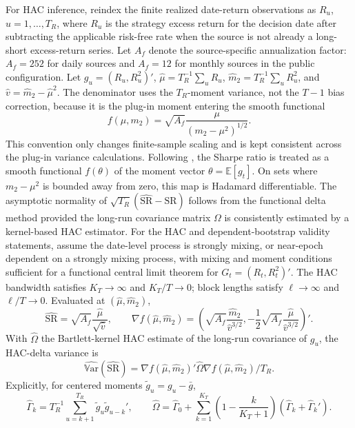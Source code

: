 \documentclass[12pt,a4paper]{article}
\newcommand{\E}{\mathbb{E}}
\newcommand{\Var}{\mathbb{V}\mathrm{ar}}
\newcommand{\SR}{\mathrm{SR}}
\begin{document}
For HAC inference, reindex the finite realized date-return observations
as \(R_u\), \(u=1,\ldots,T_R\), where \(R_u\) is the strategy excess
return for the decision date after subtracting the applicable risk-free
rate when the source is not already a long-short excess-return series.
Let \(A_f\) denote the source-specific annualization factor: \(A_f=252\)
for daily sources and \(A_f=12\) for monthly sources in the public
configuration.
Let \(g_u=(R_u,R_u^2)'\),
\(\hat\mu=T_R^{-1}\sum_u R_u\),
\(\hat m_2=T_R^{-1}\sum_u R_u^2\), and
\(\hat v=\hat m_2-\hat\mu^2\).  The denominator uses the \(T_R\)-moment
variance, not the \(T-1\) bias correction, because it is the plug-in
moment entering the smooth functional
\[
  f(\mu,m_2)=\sqrt{A_f}\frac{\mu}{(m_2-\mu^2)^{1/2}}.
\]
This convention only changes finite-sample scaling and is kept
consistent across the plug-in variance calculations.
Following \citet{ledoit2008robust}, the Sharpe ratio is treated as a
smooth functional \(f(\theta)\) of the moment vector
\(\theta=\E[g_t]\).  On sets where \(m_2-\mu^2\) is bounded away from
zero, this map is Hadamard differentiable.  The asymptotic normality of
\(\sqrt{T_R}(\widehat{\SR}-\SR)\) follows from the functional delta method
provided the long-run covariance matrix \(\Omega\) is consistently
estimated by a kernel-based HAC estimator.
For the HAC and dependent-bootstrap validity statements, assume the
date-level process is strongly mixing, or near-epoch dependent on a
strongly mixing process, with mixing and moment conditions sufficient
for a functional central limit theorem for \(G_t=(R_t,R_t^2)'\).  The
HAC bandwidth satisfies \(K_T\to\infty\) and \(K_T/T\to0\); block
lengths satisfy \(\ell\to\infty\) and \(\ell/T\to0\).
Evaluated at \((\hat\mu,\hat m_2)\),
\[
  \widehat{\SR}=\sqrt{A_f}\frac{\hat\mu}{\sqrt{\hat v}},
  \qquad
  \nabla f(\hat\mu,\hat m_2) =
  \left(
  \sqrt{A_f}\frac{\hat m_2}{\hat v^{3/2}},
  -\frac{1}{2}\sqrt{A_f}\frac{\hat\mu}{\hat v^{3/2}}
  \right)' .
\]
With \(\widehat{\Omega}\) the Bartlett-kernel HAC estimate of the
long-run covariance of \(g_u\), the HAC-delta variance is
\begin{equation}
  \widehat{\Var}(\widehat{\SR})
  =\nabla f(\hat\mu,\hat m_2)'\widehat{\Omega}
   \nabla f(\hat\mu,\hat m_2)/T_R .
  \label{eq:hac-delta}
\end{equation}
Explicitly, for centered moments \(\tilde g_u=g_u-\bar g\),
\[
  \widehat{\Gamma}_k
  = T_R^{-1}\sum_{u=k+1}^{T_R}\tilde g_u\tilde g_{u-k}',
  \qquad
  \widehat{\Omega}
  = \widehat{\Gamma}_0
    +\sum_{k=1}^{K_T} \left(1-\frac{k}{K_T+1}\right)
      \left(\widehat{\Gamma}_k+\widehat{\Gamma}_k'\right).
\]
\end{document}
